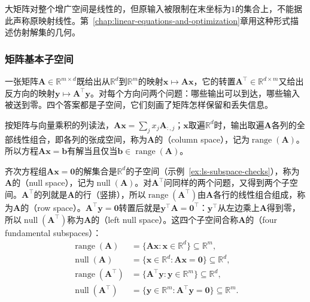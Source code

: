 大矩阵对整个增广空间是线性的，但原输入被限制在末坐标为$1$的集合上，不能据此声称原映射线性。第~\ref{chap:linear-equations-and-optimization}章用这种形式描述仿射解集的几何。

\subsubsection{矩阵基本子空间}
\label{sec:ls-four-fundamental-subspaces}

一张矩阵$\bm A\in\mathbb R^{m\times d}$既给出从$\mathbb R^d$到$\mathbb R^m$的映射$\bm x\mapsto\bm A\bm x$，它的转置$\bm A^\top\in\mathbb R^{d\times m}$又给出反方向的映射$\bm y\mapsto\bm A^\top\bm y$。对每个方向问两个问题：哪些输出可以到达，哪些输入被送到零。四个答案都是子空间，它们刻画了矩阵怎样保留和丢失信息。

按矩阵与向量乘积的列读法，$\bm A\bm x=\sum_jx_j\bm A_{:,j}$；$\bm x$取遍$\mathbb R^d$时，输出取遍$\bm A$各列的全部线性组合，即各列的张成空间，称为$\bm A$的（column space），记为$\operatorname{range}(\bm A)$。所以方程$\bm A\bm x=\bm b$有解当且仅当$\bm b\in\operatorname{range}(\bm A)$。

齐次方程组$\bm A\bm x=\bm0$的解集合是$\mathbb R^d$的子空间（示例~\ref{ex:ls-subspace-checks}），称为$\bm A$的（null space），记为$\operatorname{null}(\bm A)$。对$\bm A^\top$问同样的两个问题，又得到两个子空间。$\bm A^\top$的列就是$\bm A$的行（竖排），所以$\operatorname{range}(\bm A^\top)$由$\bm A$各行的线性组合组成，称为$\bm A$的（row space）。$\bm A^\top\bm y=\bm0$转置后就是$\bm y^\top\bm A=\bm0^\top$：$\bm y^\top$从左边乘上$\bm A$得到零，所以$\operatorname{null}(\bm A^\top)$称为$\bm A$的（left null space）。这四个子空间合称$\bm A$的（four fundamental subspaces）：
\begin{equation}
 \begin{aligned}
  \operatorname{range}(\bm A)&=\{\bm A\bm x:\bm x\in\mathbb R^d\}\subseteq\mathbb R^m,\\
  \operatorname{null}(\bm A)&=\{\bm x\in\mathbb R^d:\bm A\bm x=\bm0\}\subseteq\mathbb R^d,\\
  \operatorname{range}(\bm A^\top)&=\{\bm A^\top\bm y:\bm y\in\mathbb R^m\}\subseteq\mathbb R^d,\\
  \operatorname{null}(\bm A^\top)&=\{\bm y\in\mathbb R^m:\bm A^\top\bm y=\bm0\}\subseteq\mathbb R^m.
 \end{aligned}
 \label{eq:ls-four-fundamental-subspaces}
\end{equation}

